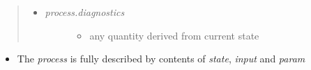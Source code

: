 \documentclass[letterpaper,10pt,english]{sphinxmanual}
\begin{document}
\begin{itemize}
\begin{quote}
\begin{itemize}
\item {} \begin{description}
\item[{\emph{process.diagnostics}}] \leavevmode\begin{itemize}
\item {} 
any quantity derived from current state

\end{itemize}

\end{description}

\end{itemize}
\end{quote}

\end{itemize}
\begin{itemize}
\item {} 
The \emph{process} is fully described by contents of \emph{state}, \emph{input} and \emph{param}

\end{itemize}
\end{document}
